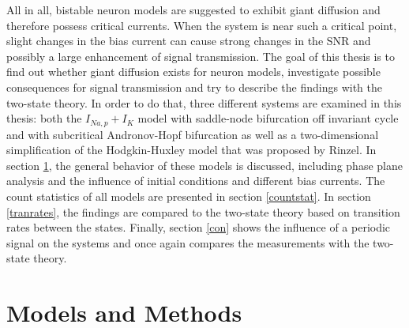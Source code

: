 \documentclass[12pt,a4paper]{article}
\begin{document}
All in all, bistable neuron models are suggested to exhibit giant diffusion and therefore possess critical currents. When the system is near such a critical point, slight changes in the bias current can cause strong changes in the SNR and possibly a large enhancement of signal transmission. The goal of this thesis is to find out whether giant diffusion exists for neuron models, investigate possible consequences for signal transmission and try to describe the findings with the two-state theory. In order to do that, three different systems are examined in this thesis: both the $I_{Na,p}+I_K$ model with saddle-node bifurcation off invariant cycle and with subcritical Andronov-Hopf bifurcation\cite{izi} as well as a two-dimensional simplification of the Hodgkin-Huxley model that was proposed by Rinzel\cite{rinzel}. In section \ref{modmet}, the general behavior of these models is discussed, including phase plane analysis and the influence of initial conditions and different bias currents. The count statistics of all models are presented in section \ref{countstat}. In section \ref{tranrates}, the findings are compared to the two-state theory based on transition rates between the states. Finally, section \ref{con} shows the influence of a periodic signal on the systems and once again compares the measurements with the two-state theory.
\newpage
\section{Models and Methods}\label{modmet}
\end{document}

